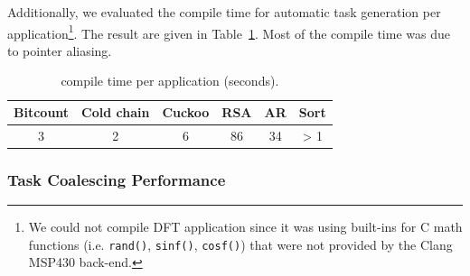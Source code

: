Additionally, we evaluated the compile time for automatic task generation per application\footnote{We could not compile DFT application since it was using built-ins for C math functions (i.e. \texttt{rand()}, \texttt{sinf()}, \texttt{cosf()}) that were not provided by the Clang MSP430 back-end.}. The result are given in Table~\ref{table:compile_time}. Most of the compile time was due to pointer aliasing.

\begin{table}[t]
	\centering
	\footnotesize
	\begin{tabular}{|c|c|c|c|c|c|}
		\hline
		Bitcount & Cold chain & Cuckoo & RSA & AR & Sort \\
		\hline\hline
		3 & 2 & 6 & 86 & 34 & > 1 \\
		\hline
	\end{tabular}
	\caption{\sys compile time per application (seconds).}
\label{table:compile_time}
\end{table}

\subsubsection{Task Coalescing Performance}
\label{sec:results_coalescing}

